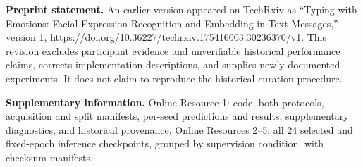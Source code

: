 \documentclass[pdflatex,sn-mathphys-num]{sn-jnl}
\begin{document}
\noindent\textbf{Preprint statement.} An earlier version appeared on TechRxiv as ``Typing with Emotions: Facial Expression Recognition and Embedding in Text Messages,'' version 1, \url{https://doi.org/10.36227/techrxiv.175416003.30236370/v1}. This revision excludes participant evidence and unverifiable historical performance claims, corrects implementation descriptions, and supplies newly documented experiments. It does not claim to reproduce the historical curation procedure.

\noindent\textbf{Supplementary information.} Online Resource 1: code, both protocols, acquisition and split manifests, per-seed predictions and results, supplementary diagnostics, and historical provenance. Online Resources 2--5: all 24 selected and fixed-epoch inference checkpoints, grouped by supervision condition, with checksum manifests.


\end{document}
